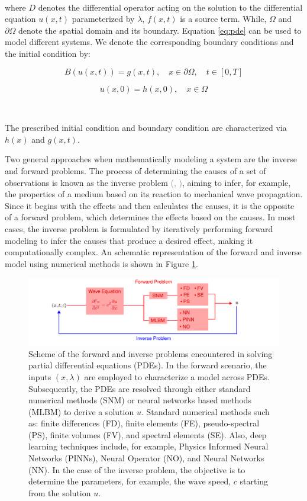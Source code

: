 \documentclass[11pt,twoside]{article}
\renewcommand{\citep}[2][]{\textcolor{gray}{(\citeauthor{#2}, \citeyear[#1]{#2})}}
\begin{document}
\

where $D$ denotes the differential operator acting on the solution to the differential equation $u(x,t)$ parameterized by $\lambda$, $f(x, t)$ is a source term. While, $\Omega$ and $\partial\Omega$ denote the spatial domain and its boundary. Equation \ref{eq:pde} can be used to model different systems. We denote the corresponding boundary conditions and the initial condition by:

\begin{equation}
B (u(x, t)) = g(x, t), \quad x \in \partial \Omega, \quad t \in [0, T] 
\end{equation}

\begin{equation}
u(x, 0) = h(x, 0), \quad x \in \Omega
\end{equation}

\

The prescribed initial condition and boundary condition are characterized via $h(x)$ and $g(x, t)$.

Two general approaches when mathematically modeling a system are the inverse and forward problems. The process of determining the causes of a set of observations is known as the inverse problem \citep{Tarantola}, aiming to infer, for example, the properties of a medium based on its reaction to mechanical wave propagation. Since it begins with the effects and then calculates the causes, it is the opposite of a forward problem, which determines the effects based on the causes. In most cases, the inverse problem is formulated by iteratively performing forward modeling to infer the causes that produce a desired effect, making it computationally complex. An schematic representation of the forward and inverse model using numerical methods is shown in Figure \ref{fig:forward_inverse}.

\begin{figure}[tb!]
\includegraphics{figs/Forward_Inverse_Modeling_Waves.pdf}
    \caption{Scheme of the forward and inverse problems encountered in solving partial differential equations (PDEs). In the forward scenario, the inputs $(x,\lambda)$ are employed to characterize a model across PDEs. Subsequently, the PDEs are resolved through either standard numerical methods (SNM) or neural networks based methods (MLBM) to derive a solution $u$. Standard numerical methods such as: finite differences (FD), finite elements (FE), pseudo-spectral (PS), finite volumes (FV), and spectral elements (SE). Also, deep learning techniques include, for example, Physics Informed Neural Networks (PINNs), Neural Operator (NO), and Neural Networks (NN). In the case of the inverse problem, the objective is to determine the parameters, for example, the wave speed, $c$ starting from the solution $u$.}
    \label{fig:forward_inverse}
\end{figure}
\end{document}
